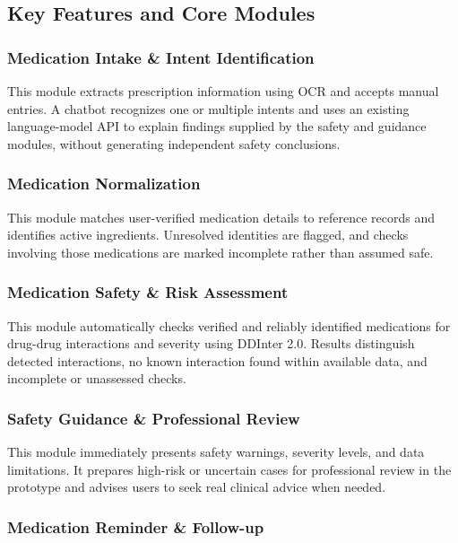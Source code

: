 \subsection{Key Features and Core Modules}

\subsubsection{Medication Intake \& Intent Identification}

This module extracts prescription information using OCR and accepts manual entries. A chatbot recognizes one or multiple intents and uses an existing language-model API to explain findings supplied by the safety and guidance modules, without generating independent safety conclusions.

\subsubsection{Medication Normalization}

This module matches user-verified medication details to reference records and identifies active ingredients. Unresolved identities are flagged, and checks involving those medications are marked incomplete rather than assumed safe.

\subsubsection{Medication Safety \& Risk Assessment}

This module automatically checks verified and reliably identified medications for drug-drug interactions and severity using DDInter 2.0. Results distinguish detected interactions, no known interaction found within available data, and incomplete or unassessed checks.

\subsubsection{Safety Guidance \& Professional Review}

This module immediately presents safety warnings, severity levels, and data limitations. It prepares high-risk or uncertain cases for professional review in the prototype and advises users to seek real clinical advice when needed.

\subsubsection{Medication Reminder \& Follow-up}

